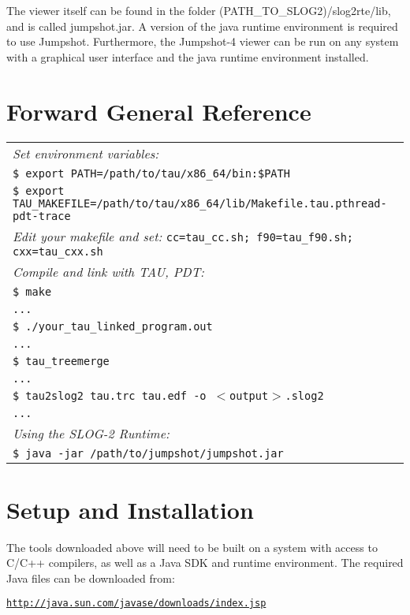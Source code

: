 \documentclass[11pt,letterpaper]{article}
\begin{document}
The viewer itself can be found in the folder (PATH\_TO\_SLOG2)/slog2rte/lib, and is called jumpshot.jar. A version of the java runtime environment is required to use Jumpshot. Furthermore, the Jumpshot-4 viewer can be run on any system with a graphical user interface and the java runtime environment installed.


\section{Forward General Reference}
\begin{tabular}{ l }
{\it Set environment variables:} \\
{\tt \$ export PATH=/path/to/tau/x86\_64/bin:\$PATH} \\
{\tt \$ export TAU\_MAKEFILE=/path/to/tau/x86\_64/lib/Makefile.tau.pthread-pdt-trace} \\
{\it Edit your makefile and set:} {\tt cc=tau\_cc.sh; f90=tau\_f90.sh; cxx=tau\_cxx.sh} \\
{\it Compile and link with TAU, PDT:} \\
{\tt \$ make} \\
{\tt ...} \\
{\tt \$ ./your\_tau\_linked\_program.out} \\
{\tt ...} \\
{\tt \$ tau\_treemerge} \\
{\tt ...} \\
{\tt \$ tau2slog2 tau.trc tau.edf -o $<$output$>$.slog2} \\
{\tt ...} \\
{\it Using the SLOG-2 Runtime:} \\
{\tt \$ java -jar /path/to/jumpshot/jumpshot.jar} \\
\end{tabular}


\section{Setup and Installation}
The tools downloaded above will need to be built on a system with access to C/C++ compilers, as well as a Java SDK and runtime environment. The required Java files can be downloaded from:
\begin{link_url}
\texttt{\url{http://java.sun.com/javase/downloads/index.jsp}}
\end{link_url}
\end{document}
